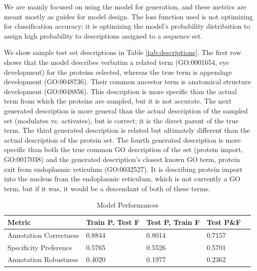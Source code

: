 \documentclass{article}
\begin{document}
        We are mainly focused on using the model for generation, and these metrics are meant mostly as guides for model design. The loss function used is not optimizing for classification accuracy; it is optimizing the model's probability distribution to assign high probability to descriptions assigned to a sequence set.

        We show sample test set descriptions in Table \ref{tab:descriptions}. The first row shows that the model describes verbatim a related term (GO:0001654, eye development) for the proteins selected, whereas the true term is appendage development (GO:0048736). Their common ancestor term is anatomical structure development (GO:0048856). This description is more specific than the actual term from which the proteins are sampled, but it is not accurate. The next generated description is more general than the actual description of the sampled set (modulates vs. activates), but is correct; it is the direct parent of the true term. The third generated description is related but ultimately different than the actual description of the protein set. The fourth generated description is more specific than both the true common GO description of the set (protein import, GO:0017038) and the generated description's closest known GO term, protein exit from endoplasmic reticulum (GO:0032527). It is describing protein import into the nucleus from the endoplasmic reticulum, which is not currently a GO term, but if it was, it would be a descendant of both of these terms.
\begin{table}
	\caption{Model Performances}
	\centering
	\begin{tabular}{l|llll}
		\toprule
        Metric & Train P, Test F & Test P, Train F & Test P\&F \\
		\midrule
        Annotation Correctness & 0.8844 & 0.8014 & 0.7157 \\
        Specificity Preference & 0.5765 & 0.5526 & 0.5701 \\
		Annotation Robustness & 0.4020 & 0.1977 & 0.2362 \\
		\bottomrule
	\end{tabular}
	\label{tab:performances}
\end{table}
\end{document}
